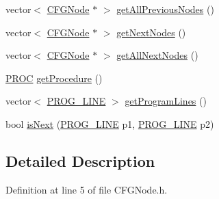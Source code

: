 \begin{DoxyCompactItemize}
vector$<$ \hyperlink{class_c_f_g_node}{C\-F\-G\-Node} $\ast$ $>$ \hyperlink{class_c_f_g_node_ab2efcbc2cbc05f0aed11ea57bf0f9357}{get\-All\-Previous\-Nodes} ()
\item 
vector$<$ \hyperlink{class_c_f_g_node}{C\-F\-G\-Node} $\ast$ $>$ \hyperlink{class_c_f_g_node_a715f4e65329fdd0948f39eaf44d37ebd}{get\-Next\-Nodes} ()
\item 
vector$<$ \hyperlink{class_c_f_g_node}{C\-F\-G\-Node} $\ast$ $>$ \hyperlink{class_c_f_g_node_a7392e9f7ad4f5cf935948d9695c586ab}{get\-All\-Next\-Nodes} ()
\item 
\hyperlink{std_afx_8h_aa07ea1d188c7b45668f1bd82ffd6d87e}{P\-R\-O\-C} \hyperlink{class_c_f_g_node_a2c9700b808aad05029293f0d1cd13b01}{get\-Procedure} ()
\item 
vector$<$ \hyperlink{std_afx_8h_abcc2d0120d16c2587a85b314010f6399}{P\-R\-O\-G\-\_\-\-L\-I\-N\-E} $>$ \hyperlink{class_c_f_g_node_a00d7decf2f7e7068accae7b2e59f4a7a}{get\-Program\-Lines} ()
\item 
bool \hyperlink{class_c_f_g_node_aa0b5bc3202db67e6834fb82fc7c059cf}{is\-Next} (\hyperlink{std_afx_8h_abcc2d0120d16c2587a85b314010f6399}{P\-R\-O\-G\-\_\-\-L\-I\-N\-E} p1, \hyperlink{std_afx_8h_abcc2d0120d16c2587a85b314010f6399}{P\-R\-O\-G\-\_\-\-L\-I\-N\-E} p2)
\end{DoxyCompactItemize}


\subsection{Detailed Description}


Definition at line 5 of file C\-F\-G\-Node.\-h.



